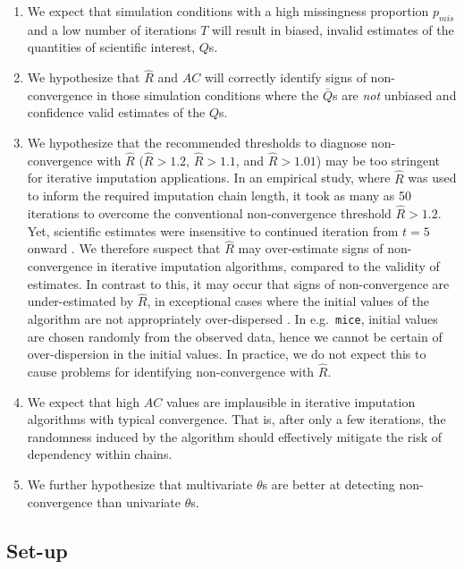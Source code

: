 \documentclass[Royal,times,sageh]{sagej}
\begin{document}
\begin{enumerate}
\def\labelenumi{\arabic{enumi}.}
\item
  We expect that simulation conditions with a high missingness proportion \(p_{mis}\) and a low number of iterations \(T\) will result in biased, invalid estimates of the quantities of scientific interest, \(Q\)s.
\item
  We hypothesize that \(\widehat{R}\) and \(AC\) will correctly identify signs of non-convergence in those simulation conditions where the \(\bar{Q}\)s are \emph{not} unbiased and confidence valid estimates of the \(Q\)s.
\item
  We hypothesize that the recommended thresholds to diagnose non-convergence with \(\widehat{R}\) (\(\widehat{R} > 1.2\), \(\widehat{R} > 1.1\), and \(\widehat{R} > 1.01\)) may be too stringent for iterative imputation applications. In an empirical study, where \(\widehat{R}\) was used to inform the required imputation chain length, it took as many as 50 iterations to overcome the conventional non-convergence threshold \(\widehat{R}>1.2\). Yet, scientific estimates were insensitive to continued iteration from \(t=5\) onward \citep{lace07}. We therefore suspect that \(\widehat{R}\) may over-estimate signs of non-convergence in iterative imputation algorithms, compared to the validity of estimates. In contrast to this, it may occur that signs of non-convergence are under-estimated by \(\widehat{R}\), in exceptional cases where the initial values of the algorithm are not appropriately over-dispersed \citep[p.~437]{broo98}. In e.g.~\texttt{mice}, initial values are chosen randomly from the observed data, hence we cannot be certain of over-dispersion in the initial values. In practice, we do not expect this to cause problems for identifying non-convergence with \(\widehat{R}\).
\item
  We expect that high \(AC\) values are implausible in iterative imputation algorithms with typical convergence. That is, after only a few iterations, the randomness induced by the algorithm should effectively mitigate the risk of dependency within chains.
\item
  We further hypothesize that multivariate \(\theta\)s are better at detecting non-convergence than univariate \(\theta\)s.
\end{enumerate}

\hypertarget{set-up}{%
\subsection{Set-up}\label{set-up}}
\end{document}
